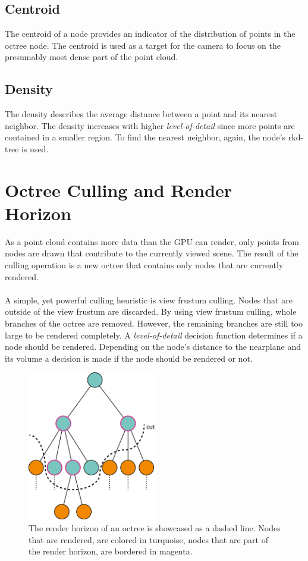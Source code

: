 \subsection{Centroid}

The centroid of a node provides an indicator of the distribution of points in the octree node. The centroid is used as a target for the camera to focus on the presumably most dense part of the point cloud. 


\subsection{Density}

The density describes the average distance between a point and its nearest neighbor. The density increases with higher \textit{level-of-detail} since more points are contained in a smaller region. To find the nearest neighbor, again, the node's rkd-tree is used. 


\section{Octree Culling and Render Horizon}
\label{sec:renderHorizon}

As a point cloud contains more data than the GPU can render, only points from nodes are drawn that contribute to the currently viewed scene. The result of the culling operation is a new octree that contains only nodes that are currently rendered. 
\\
\\
A simple, yet powerful culling heuristic is view frustum culling. Nodes that are outside of the view frustum are discarded. By using view frustum culling, whole branches of the octree are removed. However, the remaining branches are still too large to be rendered completely. A \textit{level-of-detail} decision function determines if a node should be rendered. Depending on the node's distance to the nearplane and its volume a decision is made if the node should be rendered or not. 

\begin{figure}
    \centering
    \includegraphics[width=0.5\textwidth]{Octree/renderHorizon.png}
    \caption{The render horizon of an octree is showcased as a dashed line. Nodes that are rendered, are colored in turquoise, nodes that are part of the render horizon, are bordered in magenta. }
    \label{fig:renderHorizon}
\end{figure}


